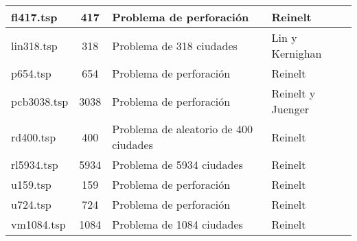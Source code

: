 \begin{table}[]
{{\begin{tabular}{lcll}
fl417.tsp                                                                            & 417                                      & Problema de perforación 					                                           	  & Reinelt                                   		  									\\ \hline
lin318.tsp                                                                           & 318                                      & Problema de 318 ciudades				                                                  & Lin y Kernighan                                   		  							\\ \hline
p654.tsp                                                                             & 654                                      & Problema de perforación					                                              & Reinelt                                   		  									\\ \hline
pcb3038.tsp                                                                          & 3038                                     & Problema de perforación 								                                  & Reinelt y Juenger                                   		  						\\ \hline
rd400.tsp                                                                            & 400                                      & Problema de aleatorio de 400 ciudades			                                          & Reinelt                                   		  									\\ \hline
rl5934.tsp                                                                           & 5934                                     & Problema de 5934 ciudades				                                                  & Reinelt                                   		  									\\ \hline
u159.tsp                                                                             & 159                                      & Problema de perforación						                                          & Reinelt                                   		  									\\ \hline
u724.tsp                                                                             & 724                                      & Problema de perforación						                                          & Reinelt                                   		  									\\ \hline
vm1084.tsp                                                                           & 1084                                     & Problema de 1084 ciudades			                                                      & Reinelt                                   		  									\\ \hline
\end{tabular}
}
}
\label{table:DescripcionPruebasTSP}
\end{table}




